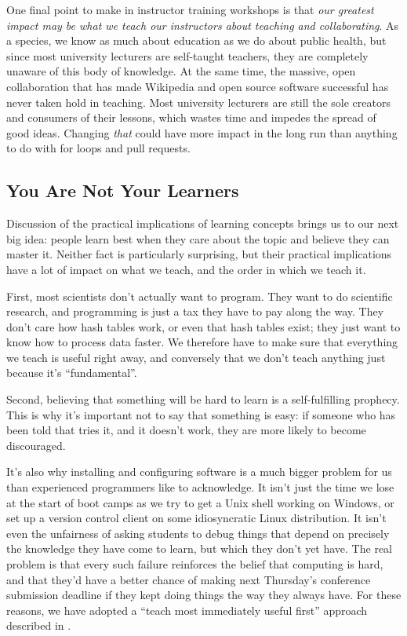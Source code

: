One final point to make in instructor training workshops is that
\emph{our greatest impact may be what we teach our instructors about
teaching and collaborating}. As a species, we know as much about
education as we do about public health, but since most university
lecturers are self-taught teachers, they are completely unaware of this
body of knowledge. At the same time, the massive, open collaboration
that has made Wikipedia and open source software successful has never
taken hold in teaching. Most university lecturers are still the sole
creators and consumers of their lessons, which wastes time and impedes
the spread of good ideas. Changing \emph{that} could have more impact in
the long run than anything to do with for loops and pull requests.

\subsection{You Are Not Your Learners}\label{you-are-not-your-learners}

Discussion of the practical implications of learning concepts brings us
to our next big idea: people learn best when they care about the topic
and believe they can master it. Neither fact is particularly surprising,
but their practical implications have a lot of impact on what we teach,
and the order in which we teach it.

First, most scientists don't actually want to program. They want to do
scientific research, and programming is just a tax they have to pay
along the way. They don't care how hash tables work, or even that hash
tables exist; they just want to know how to process data faster. We
therefore have to make sure that everything we teach is useful right
away, and conversely that we don't teach anything just because it's
``fundamental''.

Second, believing that something will be hard to learn is a
self-fulfilling prophecy. This is why it's important not to say that
something is easy: if someone who has been told that tries it, and it
doesn't work, they are more likely to become discouraged.

It's also why installing and configuring software is a much bigger
problem for us than experienced programmers like to acknowledge. It
isn't just the time we lose at the start of boot camps as we try to get
a Unix shell working on Windows, or set up a version control client on
some idiosyncratic Linux distribution. It isn't even the unfairness of
asking students to debug things that depend on precisely the knowledge
they have come to learn, but which they don't yet have. The real problem
is that every such failure reinforces the belief that computing is hard,
and that they'd have a better chance of making next Thursday's
conference submission deadline if they kept doing things the way they
always have. For these reasons, we have adopted a ``teach most
immediately useful first'' approach described in .

